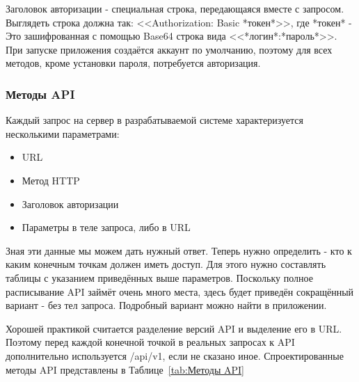 \documentclass[a4paper,article]{article}
\begin{document}
    Заголовок авторизации - специальная строка, передающаяся вместе с запросом. Выглядеть строка должна так: <<Authorization: Basic *токен*>>, где *токен* - Это зашифрованная с помощью Base64 строка вида <<*логин*:*пароль*>>. При запуске приложения создаётся аккаунт по умолчанию, поэтому для всех методов, кроме установки пароля, потребуется авторизация.

    \subsubsection{Методы API}

    Каждый запрос на сервер в разрабатываемой системе характеризуется несколькими параметрами:

    \begin{itemize}[nolistsep]
        \item URL
        \item Метод HTTP
        \item Заголовок авторизации
        \item Параметры в теле запроса, либо в URL
    \end{itemize}

    Зная эти данные мы можем дать нужный ответ. Теперь нужно определить - кто к каким конечным точкам должен иметь доступ. Для этого нужно составлять таблицы с указанием приведённых выше параметров. Поскольку полное расписывание API займёт очень много места, здесь будет приведён сокращённый вариант - без тел запроса. Подробный вариант можно найти в приложении.

    Хорошей практикой считается разделение версий API и выделение его в URL. Поэтому перед каждой конечной точкой в реальных запросах к API дополнительно используется /api/v1, если не сказано иное. Спроектированные методы API представлены в Таблице~\ref{tab:Методы API}
\end{document}
